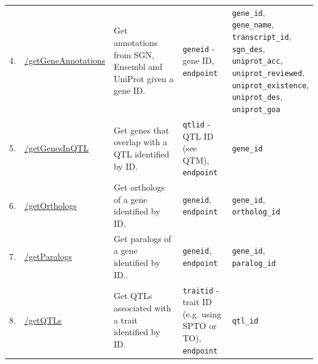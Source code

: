 \documentclass[applsci,article,accept,moreauthors,pdftex]{Definitions/mdpi}
\begin{document}
{\begin{table}[H]
{\begin{tabular}{m{1.2cm}<{\raggedright}m{3cm}<{\raggedright}m{3.5cm}<{\raggedright}m{4.5cm}<{\raggedright}m{3cm}<{\raggedright}}
4. & \href{http://localhost:8088/api-local/\#/Get\%20annotations\%20given\%20a\%20gene/get_getGeneAnnotations}{/getGeneAnnotations}
& Get annotations from SGN, Ensembl and UniProt given a gene ID.
& \makecell[l]{\texttt{geneid} - gene ID, \\ \texttt{endpoint}}
& \makecell[l]{\texttt{gene\_id},\\ \texttt{gene\_name},\\ \texttt{transcript\_id},\\ \texttt{sgn\_des},\\ \texttt{uniprot\_acc},\\ \texttt{uniprot\_reviewed},\\ \texttt{uniprot\_existence},\\ \texttt{uniprot\_des},\\ \texttt{uniprot\_goa}}\\

5. & \href{http://localhost:8088/api-local/\#/Get\%20genes\%20in\%20a\%20QTL/get_getGenesInQTL}{/getGenesInQTL}
& Get genes that overlap with a QTL identified by ID.
& \makecell[l]{\texttt{qtlid} - QTL ID (see QTM),\\ \texttt{endpoint}}
& \texttt{gene{\_}id}\\

6. & \href{http://localhost:8088/api-local/\#/Get\%20orthologs\%20of\%20a\%20gene/get_getOrthologs}{/getOrthologs}
& Get orthologs of a gene identified by ID.
& \makecell[l]{\texttt{geneid},\\ \texttt{endpoint}}
& \makecell[l]{\texttt{gene\_id}, \\ \texttt{ortholog\_id}}\\

7. & \href{http://localhost:8088/api-local/\#/Get\%20paralogs\%20of\%20a\%20gene/get_getParalogs}{/getParalogs}
& Get paralogs of a gene identified by ID..
& \makecell[l]{\texttt{geneid},\\ \texttt{endpoint}}
& \makecell[l]{\texttt{gene\_id}, \\ \texttt{paralog\_id}}\\

8. & \href{http://localhost:8088/api-local/\#/Get\%20QTLs\%20associated\%20with\%20a\%20trait/get_getQTLs}{/getQTLs}
& Get QTLs associated with a trait identified by ID.
& \makecell[l]{\texttt{traitid} - trait ID \\(e.g. using SPTO or TO),\\ \texttt{endpoint}}
& \texttt{qtl\_id}\\


\end{tabular}}
\end{table}}
\end{document}

